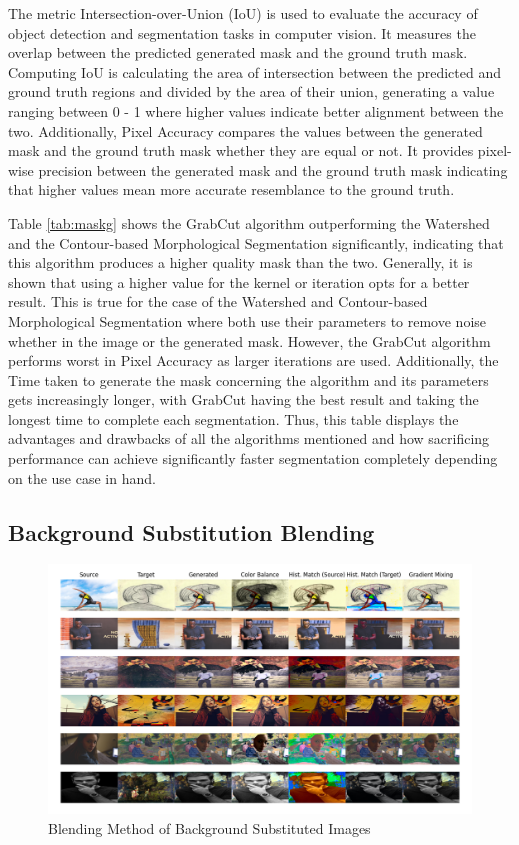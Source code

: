 \documentclass{article}
\begin{document}
The metric Intersection-over-Union (IoU) is used to evaluate the accuracy of object detection and segmentation tasks in computer vision. It measures the overlap between the predicted generated mask and the ground truth mask. Computing IoU is calculating the area of intersection between the predicted and ground truth regions and divided by the area of their union, generating a value ranging between 0 - 1 where higher values indicate better alignment between the two. Additionally, Pixel Accuracy compares the values between the generated mask and the ground truth mask whether they are equal or not. It provides pixel-wise precision between the generated mask and the ground truth mask indicating that higher values mean more accurate resemblance to the ground truth.

Table \ref{tab:maskg} shows the GrabCut algorithm outperforming the Watershed and the Contour-based Morphological Segmentation significantly, indicating that this algorithm produces a higher quality mask than the two. Generally, it is shown that using a higher value for the kernel or iteration opts for a better result. This is true for the case of the Watershed and Contour-based Morphological Segmentation where both use their parameters to remove noise whether in the image or the generated mask. However, the GrabCut algorithm performs worst in Pixel Accuracy as larger iterations are used. Additionally, the Time taken to generate the mask concerning the algorithm and its parameters gets increasingly longer, with GrabCut having the best result and taking the longest time to complete each segmentation. Thus, this table displays the advantages and drawbacks of all the algorithms mentioned and how sacrificing performance can achieve significantly faster segmentation completely depending on the use case in hand.

\subsection{Background Substitution Blending}

\begin{figure}[htbp]
    \centering
    \includegraphics[width=1\linewidth]{img/GBlend.png}
    \caption{Blending Method of Background Substituted Images}
    \label{fig:bmimage}
\end{figure}
\end{document}
